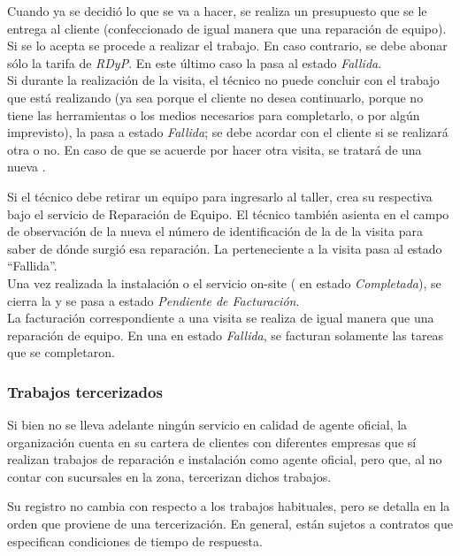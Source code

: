 \documentclass[12pt]{extarticle}
\begin{document}
\begin{spacing}{1.2}
    Cuando ya se decidió lo que se va a hacer, se realiza un presupuesto que se le entrega al cliente (confeccionado de igual manera que una reparación de equipo). Si se lo acepta se procede a realizar el trabajo. En caso contrario, se debe abonar sólo la tarifa de \textit{RDyP}. En este último caso la \OT{} pasa al estado \textit{Fallida}.\\

    Si durante la realización de la visita, el técnico no puede concluir con el trabajo que está realizando (ya sea porque el cliente no desea continuarlo, porque no tiene las herramientas o los medios necesarios para completarlo, o por algún imprevisto), la \OT{} pasa a estado \textit{Fallida}; se debe acordar con el cliente si se realizará otra o no. En caso de que se acuerde por hacer otra visita, se tratará de una nueva \OT{}.
    
    Si el técnico debe retirar un equipo para ingresarlo al taller, crea su respectiva \OT{} bajo el servicio de Reparación de Equipo. El técnico también asienta en el campo de observación de la nueva \OT{} el número de identificación de la \OT{} de la visita para saber de dónde surgió esa reparación. La \OT{} perteneciente a la visita pasa al estado ``Fallida''.\\

    Una vez realizada la instalación o el servicio on-site (\OT{} en estado \textit{Completada}), se cierra la \OT{} y se pasa a estado \textit{Pendiente de Facturación}.\\

    La facturación correspondiente a una visita se realiza de igual manera que una reparación de equipo. En una \OT{} en estado \textit{Fallida}, se facturan solamente las tareas que se completaron.

    \subsubsection{Trabajos tercerizados}
    Si bien no se lleva adelante ningún servicio en calidad de agente oficial, la organización cuenta en su cartera de clientes con diferentes empresas que sí realizan trabajos de reparación e instalación como agente oficial, pero que, al no contar con sucursales en la zona, tercerizan dichos trabajos.

    Su registro no cambia con respecto a los trabajos habituales, pero se detalla en la orden que proviene de una tercerización.
    En general, están sujetos a contratos que especifican condiciones de tiempo de respuesta.\\


\end{spacing}
\end{document}
